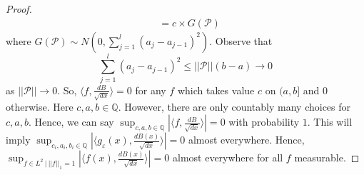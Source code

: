 \documentclass[10pt,a4paper]{amsart}
\begin{document}
\begin{proof}
\begin{equation}
\begin{split}
&= c \times G(\mathcal{P})
\end{split}
\end{equation}
where $G(\mathcal{P}) \sim N(0, \sum_{j=1}^{l}(a_{j}-a_{j-1})^2)$. Observe that 
\[
\sum_{j=1}^{l} (a_{j}-a_{j-1})^2\le ||\mathcal{P}||(b-a) \to 0
\] 
as $||\mathcal{P}|| \to 0$. So, $\langle f, \frac{dB}{\sqrt{dx}} \rangle=0$ for any $f$ which takes value $c$ on $(a,b]$ and $0$ otherwise. Here $c,a,b \in \mathbb{Q}$. However, there are only countably many choices for $c,a,b$. Hence, we can say $\sup_{c,a,b \in \mathbb{Q}} \left|\langle f, \frac{dB}{\sqrt{dx}} \rangle\right|=0$ with probability $1$. This will imply $\sup_{c_{i},a_{i},b_{i} \in \mathbb{Q}}\left|\langle g_{\varepsilon}(x), \frac{dB(x)}{\sqrt{dx}} \rangle\right| =0$ almost everywhere. Hence, $\sup_{f \in L^{2}~|~ ||f||_{1}=1}\left|\langle f(x), \frac{dB(x)}{\sqrt{dx}} \rangle\right| =0$ almost everywhere for all $f$ measurable. 
\end{proof} 
\end{document}
